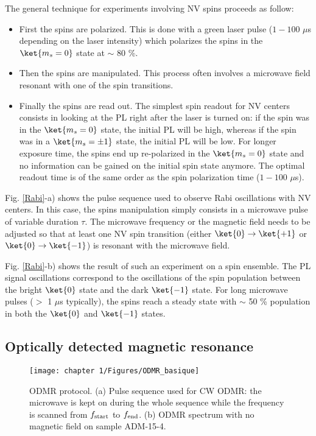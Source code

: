 \documentclass[a4paper, 11pt]{book}
\begin{document}
The general technique for experiments involving NV spins proceeds as follow: 
\begin{itemize}
\item First the spins are polarized. This is done with a green laser pulse ($1-100$ $\mu$s depending on the laser intensity) which polarizes the spins in the $\ket{m_s=0}$ state at $\sim$ 80 \%.
\item  Then the spins are manipulated. This process often involves a microwave field resonant with one of the spin transitions.
\item Finally the spins are read out. The simplest spin readout for NV centers consists in looking at the PL right after the laser is turned on: if the spin was in the $\ket{m_s=0}$ state, the initial PL will be high, whereas if the spin was in a $\ket{m_s=\pm 1}$ state, the initial PL will be low. For longer exposure time, the spins end up re-polarized in the $\ket{m_s=0}$ state and no information can be gained on the initial spin state anymore. The optimal readout time is of the same order as the spin polarization time ($1-100$ $\mu$s).
\end{itemize}

Fig. \ref{Rabi}-a) shows the pulse sequence used to observe Rabi oscillations with NV centers. In this case, the spins manipulation simply consists in a microwave pulse of variable duration $\tau$. The microwave frequency or the magnetic field needs to be adjusted so that at least one NV spin transition (either $\ket{0} \to \ket{+1}$ or $\ket{0} \to \ket{-1}$) is resonant with the microwave field. 

Fig. \ref{Rabi}-b) shows the result of such an experiment on a spin ensemble. The PL signal oscillations correspond to the oscillations of the spin population between the bright $\ket{0}$ state and the dark $\ket{-1}$ state. For long microwave pulses ($>$ 1 $\mu$s typically), the spins reach a steady state with  $\sim$ 50 \% population in both the $\ket{0}$ and $\ket{-1}$ states.


\subsection{Optically detected magnetic resonance}
\begin{figure}[h!]
\centering
\texttt{[image: chapter 1/Figures/ODMR\_basique]}
\caption{ODMR protocol. (a) Pulse sequence used for CW ODMR: the microwave is kept on during the whole sequence while the frequency is scanned from $f_{\rm start}$ to $f_{\rm end}$. (b) ODMR spectrum with no magnetic field on sample ADM-15-4.}
\label{ODMR basique}
\end{figure}
\end{document}

